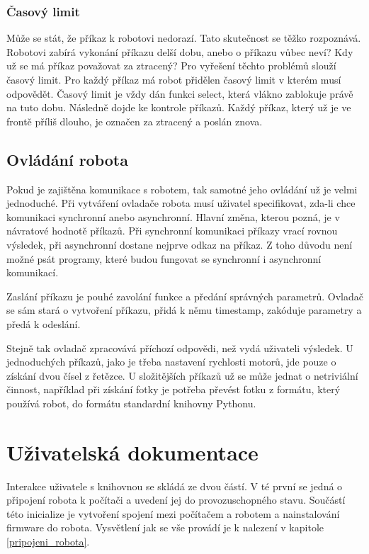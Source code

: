 \documentclass[12pt,notitlepage]{report}
\begin{document}
    \subsection{Časový limit}

    Může se stát, že příkaz k robotovi nedorazí. Tato skutečnost se těžko
    rozpoznává. Robotovi zabírá vykonání příkazu delší dobu, anebo o příkazu
    vůbec neví? Kdy už se má příkaz považovat za ztracený? Pro vyřešení těchto
    problémů slouží časový limit. Pro každý příkaz má robot přidělen časový
    limit v kterém musí odpovědět. Časový limit je vždy dán funkci select,
    která vlákno zablokuje právě na tuto dobu. Následně dojde ke kontrole
    příkazů. Každý příkaz, který už je ve frontě příliš dlouho, je označen za
    ztracený a poslán znova.

    \section{Ovládání robota}
    \label{controller}

    Pokud je zajištěna komunikace s robotem, tak samotné jeho ovládání už je
    velmi jednoduché. Při vytváření ovladače robota musí uživatel specifikovat,
    zda-li chce komunikaci synchronní anebo asynchronní. Hlavní změna, kterou
    pozná, je v návratové hodnotě příkazů. Při synchronní komunikaci příkazy
    vrací rovnou výsledek, při asynchronní dostane nejprve odkaz na příkaz. Z
    toho důvodu není možné psát programy, které budou fungovat se synchronní i
    asynchronní komunikací.

    Zaslání příkazu je pouhé zavolání funkce a předání správných parametrů.
    Ovladač se sám stará o vytvoření příkazu, přidá k němu timestamp, zakóduje
    parametry a předá k odeslání.

    Stejně tak ovladač zpracovává příchozí odpovědi, než vydá uživateli
    výsledek. U jednoduchých příkazů, jako je třeba nastavení rychlosti motorů,
    jde pouze o získání dvou čísel z řetězce. U složitějších příkazů už se může
    jednat o netriviální činnost, například při získání fotky je potřeba
    převést fotku z formátu, který používá robot, do formátu standardní
    knihovny Pythonu.

\chapter{Uživatelská dokumentace} %

    Interakce uživatele s knihovnou se skládá ze dvou částí. V té první se
    jedná o připojení robota k počítači a uvedení jej do provozuschopného
    stavu. Součástí této inicialize je vytvoření spojení mezi počítačem a
    robotem a nainstalování firmware do robota. Vysvětlení jak se vše provádí
    je k nalezení v kapitole \ref{pripojeni_robota}.
\end{document}
